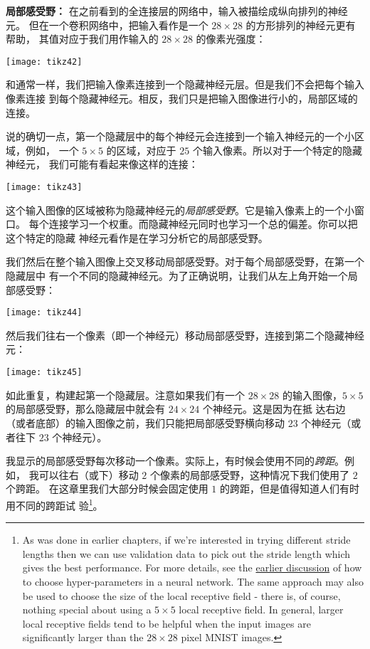 \textbf{局部感受野：} 在之前看到的全连接层的网络中，输入被描绘成纵向排列的神经元。
但在一个卷积网络中，把输入看作是一个 $28 \times 28$ 的方形排列的神经元更有帮助，
其值对应于我们用作输入的 $28 \times 28$ 的像素光强度：
\begin{center}
  \texttt{[image: tikz42]}
\end{center}

和通常一样，我们把输入像素连接到一个隐藏神经元层。但是我们不会把每个输入像素连接
到每个隐藏神经元。相反，我们只是把输入图像进行小的，局部区域的连接。

说的确切一点，第一个隐藏层中的每个神经元会连接到一个输入神经元的一个小区域，例如，
一个 $5 \times 5$ 的区域，对应于 $25$ 个输入像素。所以对于一个特定的隐藏神经元，
我们可能有看起来像这样的连接：
\begin{center}
  \texttt{[image: tikz43]}
\end{center}

这个输入图像的区域被称为隐藏神经元的\emph{局部感受野}。它是输入像素上的一个小窗口。
每个连接学习一个权重。而隐藏神经元同时也学习一个总的偏差。你可以把这个特定的隐藏
神经元看作是在学习分析它的局部感受野。

我们然后在整个输入图像上交叉移动局部感受野。对于每个局部感受野，在第一个隐藏层中
有一个不同的隐藏神经元。为了正确说明，让我们从左上角开始一个局部感受野：
\begin{center}
  \texttt{[image: tikz44]}
\end{center}

然后我们往右一个像素（即一个神经元）移动局部感受野，连接到第二个隐藏神经元：
\begin{center}
  \texttt{[image: tikz45]}
\end{center}

如此重复，构建起第一个隐藏层。注意如果我们有一个 $28 \times 28$ 的输入图像，$5
\times 5$ 的局部感受野，那么隐藏层中就会有 $24 \times 24$ 个神经元。这是因为在抵
达右边（或者底部）的输入图像之前，我们只能把局部感受野横向移动 $23$ 个神经元（或
者往下 $23$ 个神经元）。

我显示的局部感受野每次移动一个像素。实际上，有时候会使用不同的\emph{跨距}。例如，
我可以往右（或下）移动 $2$ 个像素的局部感受野，这种情况下我们使用了 $2$ 个跨距。
在这章里我们大部分时候会固定使用 $1$ 的跨距，但是值得知道人们有时用不同的跨距试
验\footnote{As was done in earlier chapters, if we're interested in trying
  different stride lengths then we can use validation data to pick out the
  stride length which gives the best performance. For more details, see the
  \hyperref[sec:how_to_choose_a_neural_network's_hyper-parameters]{earlier
    discussion} of how to choose hyper-parameters in a neural network. The same
  approach may also be used to choose the size of the local receptive field -
  there is, of course, nothing special about using a $5 \times 5$ local
  receptive field. In general, larger local receptive fields tend to be helpful
  when the input images are significantly larger than the $28 \times 28$ pixel
  MNIST images.}。\\

